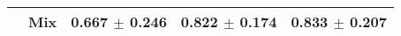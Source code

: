 \begin{tabular}[t]{lllll}
 & Mix & \textcolor[rgb]{0.3919239905,0.5000000000,0}{0.667} $\pm$ \textcolor[rgb]{0.8595019246,0.1404980754,0}{0.246} & \textcolor[rgb]{0.4988009592,0.5000000000,0}{0.822} $\pm$ \textcolor[rgb]{0.8320462826,0.1679537174,0}{0.174} & \textcolor[rgb]{0.2820512821,0.5000000000,0}{0.833} $\pm$ \textcolor[rgb]{0.3957511934,0.5000000000,0}{0.207} \\
\bottomrule
\end{tabular}

